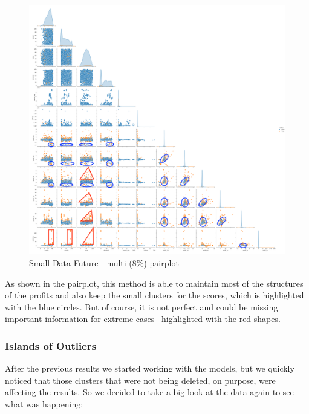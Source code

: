 \documentclass[11pt,english,a4paper,hidelinks]{book}
\begin{document}
\begin{figure}[H]
    \centering
    \includegraphics[width=1\textwidth]{images/code/outliers/Small Data future - Multi.png}
    \caption{Small Data Future - \acrshort{multi} (8\%) \acrshort{pairplot}}
    \label{fig:small_data_future_multi}
\end{figure}

\noindent As shown in the \acrshort{pairplot}, this method is able to maintain most of the structures of the profits and also keep the small clusters for the scores, which is highlighted with the blue circles. But of course, it is not perfect and could be missing important information for extreme cases --highlighted with the red shapes. 


\subsubsection{Islands of Outliers}

\noindent After the previous results we started working with the models, but we quickly noticed that those clusters that were not being deleted, on purpose, were affecting the results. So we decided to take a big look at the data again to see what was happening:
\end{document}
